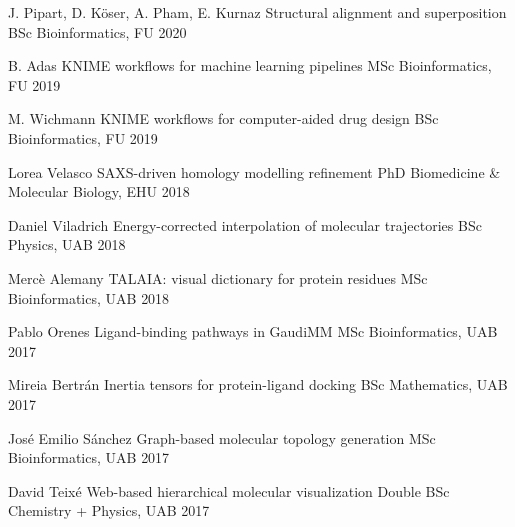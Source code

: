 

\begin{cvhonors}

\cvhonor
    {J. Pipart, D. Köser, A. Pham, E. Kurnaz}
    {Structural alignment and superposition}
    {BSc Bioinformatics, FU}
    {2020}

\cvhonor
    {B. Adas}
    {KNIME workflows for machine learning pipelines}
    {MSc Bioinformatics, FU}
    {2019}

\cvhonor
    {M. Wichmann}
    {KNIME workflows for computer-aided drug design}
    {BSc Bioinformatics, FU}
    {2019}

\cvhonor
    {Lorea Velasco}
    {SAXS-driven homology modelling refinement}
    {PhD Biomedicine \& Molecular Biology, EHU}
    {2018}

\cvhonor
    {Daniel Viladrich}
    {Energy-corrected interpolation of molecular trajectories}
    {BSc Physics, UAB}
    {2018}

\cvhonor
    {Mercè Alemany}
    {TALAIA: visual dictionary for protein residues}
    {MSc Bioinformatics, UAB}
    {2018}

\cvhonor
    {Pablo Orenes}
    {Ligand-binding pathways in GaudiMM}
    {MSc Bioinformatics, UAB}
    {2017}

\cvhonor
    {Mireia Bertrán}
    {Inertia tensors for protein-ligand docking}
    {BSc Mathematics, UAB}
    {2017}

\cvhonor
    {José Emilio Sánchez}
    {Graph-based molecular topology generation}
    {MSc Bioinformatics, UAB}
    {2017}

\cvhonor
    {David Teixé}
    {Web-based hierarchical molecular visualization}
    {Double BSc Chemistry + Physics, UAB}
    {2017}


\end{cvhonors}
